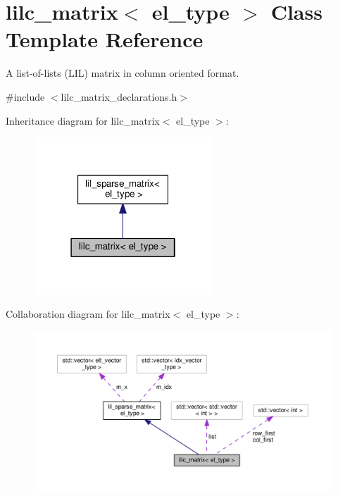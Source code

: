 \hypertarget{classlilc__matrix}{}\section{lilc\+\_\+matrix$<$ el\+\_\+type $>$ Class Template Reference}
\label{classlilc__matrix}


A list-\/of-\/lists (L\+IL) matrix in column oriented format.  




{\ttfamily \#include $<$lilc\+\_\+matrix\+\_\+declarations.\+h$>$}



Inheritance diagram for lilc\+\_\+matrix$<$ el\+\_\+type $>$\+:
\nopagebreak
\begin{figure}[H]
\begin{center}
\leavevmode
\includegraphics[width=190pt]{classlilc__matrix__inherit__graph}
\end{center}
\end{figure}


Collaboration diagram for lilc\+\_\+matrix$<$ el\+\_\+type $>$\+:
\nopagebreak
\begin{figure}[H]
\begin{center}
\leavevmode
\includegraphics[width=350pt]{classlilc__matrix__coll__graph}
\end{center}
\end{figure}
